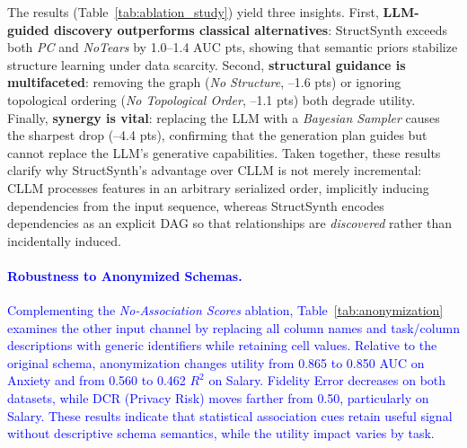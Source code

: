 The results (Table~\ref{tab:ablation_study}) yield three insights. First, \textbf{LLM-guided discovery outperforms classical alternatives}: \textsf{StructSynth} exceeds both \textit{PC} and \textit{NoTears} by 1.0--1.4 AUC pts, showing that semantic priors stabilize structure learning under data scarcity. Second, \textbf{structural guidance is multifaceted}: removing the graph (\textit{No Structure}, --1.6 pts) or ignoring topological ordering (\textit{No Topological Order}, --1.1 pts) both degrade utility. Finally, \textbf{synergy is vital}: replacing the LLM with a \textit{Bayesian Sampler} causes the sharpest drop (--4.4 pts), confirming that the generation plan guides but cannot replace the LLM's generative capabilities.
Taken together, these results clarify why \textsf{StructSynth}'s advantage over CLLM is not merely incremental: CLLM processes features in an arbitrary serialized order, implicitly inducing dependencies from the input sequence, whereas \textsf{StructSynth} encodes dependencies as an explicit DAG so that relationships are \emph{discovered} rather than incidentally induced.

\paragraph{\textcolor{blue}{Robustness to Anonymized Schemas.}}
\textcolor{blue}{Complementing the \textit{No-Association Scores} ablation, Table~\ref{tab:anonymization} examines the other input channel by replacing all column names and task/column descriptions with generic identifiers while retaining cell values. Relative to the original schema, anonymization changes utility from 0.865 to 0.850 AUC on Anxiety and from 0.560 to 0.462 $R^2$ on Salary. Fidelity Error decreases on both datasets, while DCR (Privacy Risk) moves farther from 0.50, particularly on Salary. These results indicate that statistical association cues retain useful signal without descriptive schema semantics, while the utility impact varies by task.}

